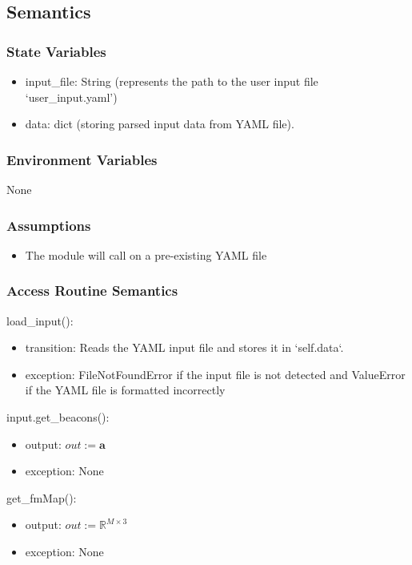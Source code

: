 \documentclass[12pt, titlepage]{article}
\begin{document}
\subsection{Semantics}

\subsubsection{State Variables}
\begin{itemize}
  \item input\_file: String (represents the path to the user input file `user\_input.yaml')
  \item data: dict (storing parsed input data from YAML file).
\end{itemize}

\subsubsection{Environment Variables}
None

\subsubsection{Assumptions}
\begin{itemize}
  \item The module will call on a pre-existing YAML file
\end{itemize}

\subsubsection{Access Routine Semantics}

\noindent load\_input():
\begin{itemize}
  \item transition: Reads the YAML input file and stores it in `self.data`.
    \item exception: FileNotFoundError if the input file is not detected and ValueError if the YAML file is formatted incorrectly
\end{itemize}

\noindent input.get\_beacons():
\begin{itemize}
    \item output: $out:=\mathbf{a}$
    \item exception: None
\end{itemize}

\noindent get\_fmMap():
\begin{itemize}
    \item output: $out:= \mathbb{R}^{M \times 3}$
    \item exception: None
\end{itemize}
\end{document}
